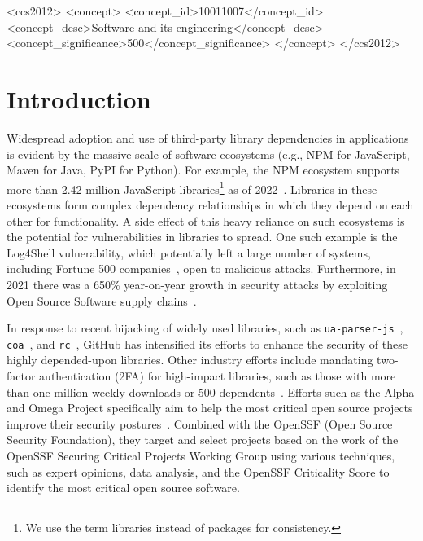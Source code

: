 \documentclass[sigconf,screen]{acmart}
\begin{document}
\begin{sloppy}
\begin{CCSXML}
<ccs2012>
   <concept>
       <concept_id>10011007</concept_id>
       <concept_desc>Software and its engineering</concept_desc>
       <concept_significance>500</concept_significance>
       </concept>
 </ccs2012>
\end{CCSXML}


\maketitle


\section{Introduction}
Widespread adoption and use of third-party library dependencies in applications is evident by the massive scale of software ecosystems (e.g., NPM for JavaScript, Maven for Java, PyPI for Python).
For example, the NPM ecosystem supports more than 2.42 million JavaScript libraries\footnote{We use the term libraries instead of packages for consistency.} as of 2022~\citep{Librarie95:online}.
Libraries in these ecosystems form complex dependency relationships in which they depend on each other for functionality.
A side effect of this heavy reliance on such ecosystems is the potential for vulnerabilities in libraries to spread.
One such example is the Log4Shell vulnerability, which potentially left a large number of systems, including Fortune 500 companies~\citep{YfryTchs40:online}, open to malicious attacks.
Furthermore, in 2021 there was a 650\% year-on-year growth in security attacks by exploiting Open Source Software supply chains~\citep{Sonatype12:online}.

In response to recent hijacking of widely used libraries, such as \texttt{ua-parser-js}~\citep{faisalma21:online}, \texttt{coa}~\citep{vegedcoa43:online}, and \texttt{rc}~\citep{dominict15:online}, GitHub has intensified its efforts to enhance the security of these highly depended-upon libraries.
Other industry efforts include mandating two-factor authentication (2FA) for high-impact libraries, such as those with more than one million weekly downloads or 500 dependents~\citep{Top100np77:online}.
Efforts such as the Alpha and Omega Project specifically aim to help the most critical open source projects improve their security postures~\citep{AlphaOme74:online}.
Combined with the OpenSSF (Open Source Security Foundation), they target and select projects based on the work of the OpenSSF Securing Critical Projects Working Group using various techniques, such as expert opinions, data analysis, and the OpenSSF Criticality Score to identify the most critical open source software.


\end{sloppy}
\end{document}
